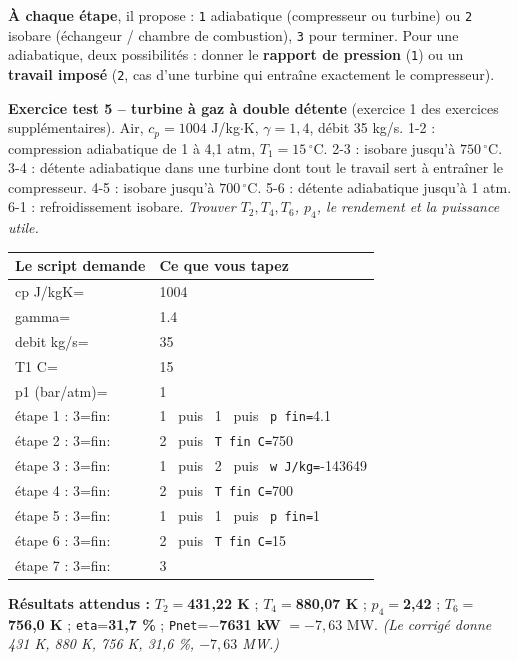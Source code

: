 \documentclass[10.5pt,a4paper]{article}
\makeatletter
\newenvironment{saisie}{%
\begin{center}\small
\begin{tabular}{@{}>{\ttfamily}l l@{}}
\toprule
\textrm{\textbf{Le script demande}} & \textbf{Ce que vous tapez} \\
\midrule
}{%
\bottomrule
\end{tabular}
\end{center}
}
\makeatother
\begin{document}
\textbf{À chaque étape}, il propose : \texttt{1} adiabatique (compresseur ou turbine) ou \texttt{2}
isobare (échangeur / chambre de combustion), \texttt{3} pour terminer. Pour une adiabatique, deux
possibilités : donner le \textbf{rapport de pression} (\texttt{1}) ou un \textbf{travail imposé}
(\texttt{2}, cas d'une turbine qui entraîne exactement le compresseur).

\begin{test}
\textbf{Exercice test 5 -- turbine à gaz à double détente} (exercice 1 des exercices supplémentaires).
Air, $c_p=1004$ J/kg$\cdot$K, $\gamma=1{,}4$, débit 35 kg/s. 1-2 : compression adiabatique de 1 à 4,1 atm,
$T_1=15\,^\circ$C. 2-3 : isobare jusqu'à $750\,^\circ$C. 3-4 : détente adiabatique dans une turbine dont
tout le travail sert à entraîner le compresseur. 4-5 : isobare jusqu'à $700\,^\circ$C. 5-6 : détente
adiabatique jusqu'à 1 atm. 6-1 : refroidissement isobare.
\emph{Trouver $T_2,T_4,T_6$, $p_4$, le rendement et la puissance utile.}

\begin{saisie}
cp J/kgK= & 1004 \\
gamma= & 1.4 \\
debit kg/s= & 35 \\
T1 C= & 15 \\
p1 (bar/atm)= & 1 \\
\textrm{étape 1 :} 3=fin: & 1 \ \textrm{puis} \ 1 \ \textrm{puis} \ \texttt{p fin=}4.1 \\
\textrm{étape 2 :} 3=fin: & 2 \ \textrm{puis} \ \texttt{T fin C=}750 \\
\textrm{étape 3 :} 3=fin: & 1 \ \textrm{puis} \ 2 \ \textrm{puis} \ \texttt{w J/kg=}-143649 \\
\textrm{étape 4 :} 3=fin: & 2 \ \textrm{puis} \ \texttt{T fin C=}700 \\
\textrm{étape 5 :} 3=fin: & 1 \ \textrm{puis} \ 1 \ \textrm{puis} \ \texttt{p fin=}1 \\
\textrm{étape 6 :} 3=fin: & 2 \ \textrm{puis} \ \texttt{T fin C=}15 \\
\textrm{étape 7 :} 3=fin: & 3 \\
\end{saisie}

\textbf{Résultats attendus :} $T_2=$\textbf{431,22 K} ; $T_4=$\textbf{880,07 K} ; $p_4=$\textbf{2,42} ;
$T_6=$\textbf{756,0 K} ; \texttt{eta}=\textbf{31,7 \%} ; \texttt{Pnet}=\textbf{$-$7631 kW} $=-7{,}63$ MW.
\emph{(Le corrigé donne 431 K, 880 K, 756 K, 31,6 \%, $-7{,}63$ MW.)}
\end{test}
\end{document}
